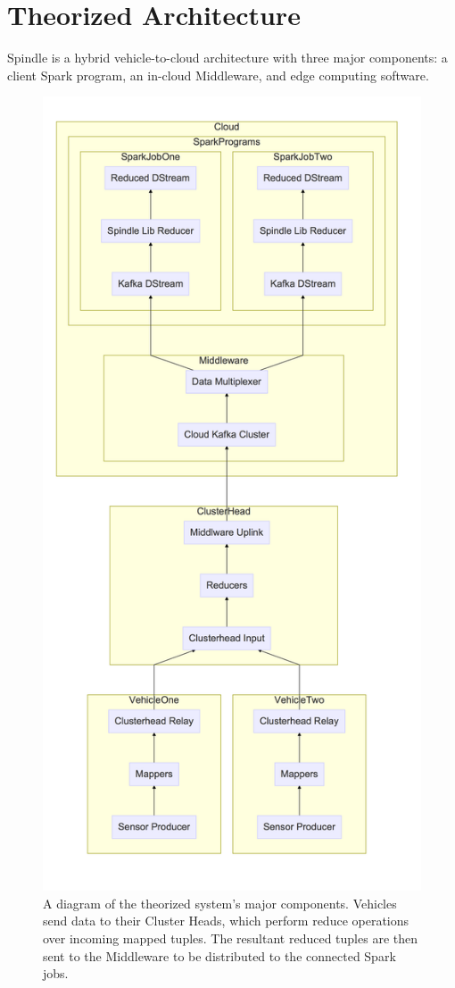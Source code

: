 \documentclass{thesis}
\begin{document}
\section{Theorized Architecture}
    Spindle is a hybrid vehicle-to-cloud architecture with three major components: a client Spark program,
    an in-cloud Middleware, and edge computing software.

    \begin{figure}
        \centering
        \includegraphics[width=0.5\linewidth]{binImages/theoretical-system.png}
        \caption{A diagram of the theorized system's major components. Vehicles
        send data to their Cluster Heads, which perform reduce operations over
        incoming mapped tuples. The resultant reduced tuples are then sent to
        the Middleware to be distributed to the connected Spark jobs.}
        \label{fig:theoretical:component}
    \end{figure}
\end{document}
